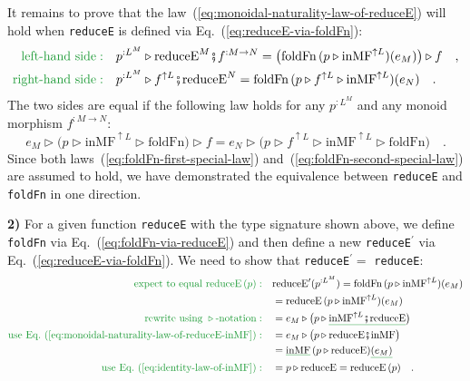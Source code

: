 It remains to prove that the law~(\ref{eq:monoidal-naturality-law-of-reduceE})
will hold when \lstinline!reduceE! is defined via Eq.~(\ref{eq:reduceE-via-foldFn}):
\begin{align*}
{\color{greenunder}\text{left-hand side}:}\quad & p^{:L^{M}}\triangleright\text{reduceE}^{M}\bef f^{:M\rightarrow N}=\big(\text{foldFn}\,(p\triangleright\text{inMF}^{\uparrow L})(e_{M})\big)\triangleright f\quad,\\
{\color{greenunder}\text{right-hand side}:}\quad & p^{:L^{M}}\triangleright f^{\uparrow L}\bef\text{reduceE}^{N}=\text{foldFn}\,(p\triangleright f^{\uparrow L}\triangleright\text{inMF}^{\uparrow L})(e_{N})\quad.
\end{align*}
The two sides are equal if the following law holds for any $p^{:L^{M}}$
and any monoid morphism $f^{:M\rightarrow N}$:
\begin{equation}
e_{M}\triangleright\big(p\triangleright\text{inMF}^{\uparrow L}\triangleright\text{foldFn}\big)\triangleright f=e_{N}\triangleright\big(p\triangleright f^{\uparrow L}\triangleright\text{inMF}^{\uparrow L}\triangleright\text{foldFn}\big)\quad.\label{eq:foldFn-second-special-law}
\end{equation}
Since both laws~(\ref{eq:foldFn-first-special-law}) and~(\ref{eq:foldFn-second-special-law})
are assumed to hold, we have demonstrated the equivalence between
\lstinline!reduceE! and \lstinline!foldFn! in one direction.

\textbf{2)} For a given function \lstinline!reduceE! with the type
signature shown above, we define \lstinline!foldFn! via Eq.~(\ref{eq:foldFn-via-reduceE})
and then define a new \lstinline!reduceE!$^{\prime}$ via Eq.~(\ref{eq:reduceE-via-foldFn}).
We need to show that \lstinline!reduceE!$^{\prime}=$ \lstinline!reduceE!:
\begin{align*}
{\color{greenunder}\text{expect to equal }\text{reduceE}\left(p\right):}\quad & \text{reduceE}^{\prime}(p^{:L^{M}})=\text{foldFn}\,(p\triangleright\text{inMF}^{\uparrow L})(e_{M})\\
 & =\text{reduceE}\,(p\triangleright\text{inMF}^{\uparrow L})(e_{M})\\
{\color{greenunder}\text{rewrite using }\triangleright\text{-notation}:}\quad & =e_{M}\triangleright\big(p\triangleright\gunderline{\text{inMF}^{\uparrow L}\bef\text{reduceE}}\big)\\
{\color{greenunder}\text{use Eq.~(\ref{eq:monoidal-naturality-law-of-reduceE-inMF})}:}\quad & =e_{M}\triangleright\big(p\triangleright\text{reduceE}\bef\text{inMF}\big)\\
 & =\gunderline{\text{inMF}}\,(p\triangleright\text{reduceE})\gunderline{(e_{M})}\\
{\color{greenunder}\text{use Eq.~(\ref{eq:identity-law-of-inMF})}:}\quad & =p\triangleright\text{reduceE}=\text{reduceE}\,(p)\quad.
\end{align*}

